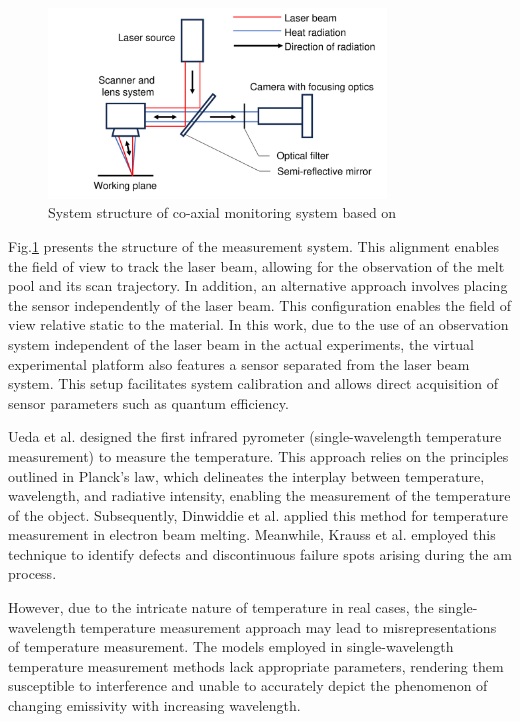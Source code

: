 \begin{figure}[htbp]
    \centering
    \includegraphics[width=0.8\textwidth]{figures/co-axial.pdf}
    \caption{System structure of co-axial monitoring system based on \cite{Craeghs.2010b}}
    \label{fig: co-axial}
\end{figure}

Fig.\ref{fig: co-axial} presents the structure of the measurement system. 
This alignment enables the field of view to track the laser beam, 
allowing for the observation of the melt pool and its scan trajectory.
In addition, an alternative approach involves placing the sensor 
independently of the laser beam. This configuration enables the 
field of view relative static to the material\cite{Craeghs.2012,Dinwiddie.2014,Price.2012,Price.2013,Rodriguez.2012,Wegner.2011}.
In this work, due to the use of an observation system independent of the 
laser beam in the actual experiments, the virtual experimental 
platform also features a sensor separated from the laser beam system. 
This setup facilitates system calibration and allows direct acquisition of 
sensor parameters such as quantum efficiency.


Ueda et al. designed the first infrared pyrometer (single-wavelength temperature 
measurement) to measure the temperature. This approach relies on the principles outlined in 
Planck's law, which delineates the interplay between temperature, 
wavelength, and radiative intensity, enabling the measurement of the 
temperature of the object\cite{Ueda.1986}. Subsequently, Dinwiddie et al. 
applied this method for temperature measurement in electron beam melting\cite{Dinwiddie.2014}. 
Meanwhile, Krauss et al. employed this technique to identify defects 
and discontinuous failure spots arising during the \gls{am} process\cite{Krauss.2012}.


However, due to the intricate nature of temperature in real cases, the 
single-wavelength temperature measurement approach may lead to 
misrepresentations of temperature measurement. The models employed in 
single-wavelength temperature measurement methods lack appropriate 
parameters, rendering them susceptible to interference and unable to 
accurately depict the phenomenon of changing emissivity with 
increasing wavelength\cite{Raplee.2017}.


